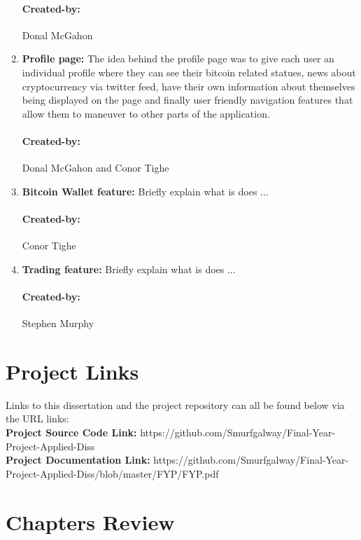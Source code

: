 \begin{enumerate}
\paragraph{Created-by:} Donal McGahon

\item \textbf{Profile page:}
The idea behind the profile page was to give each user an individual profile where they can see their bitcoin related statues, news about cryptocurrency via twitter feed, have their own information about themselves being displayed on the page and finally user friendly navigation features that allow them to maneuver to other parts of the application. 
\paragraph{Created-by:} Donal McGahon and Conor Tighe

\item \textbf{Bitcoin Wallet feature:}
Briefly explain what is does ...
\paragraph{Created-by:} Conor Tighe

\item \textbf{Trading feature:}
Briefly explain what is does ...
\paragraph{Created-by:} Stephen Murphy

\end{enumerate}

\section{Project Links}
Links to this dissertation and the project repository can all be found below via the URL links:
\\
\textbf{Project Source Code Link: } https://github.com/Smurfgalway/Final-Year-Project-Applied-Diss \\
\textbf{Project Documentation Link: } https://github.com/Smurfgalway/Final-Year-Project-Applied-Diss/blob/master/FYP/FYP.pdf\\


\section{Chapters Review}

